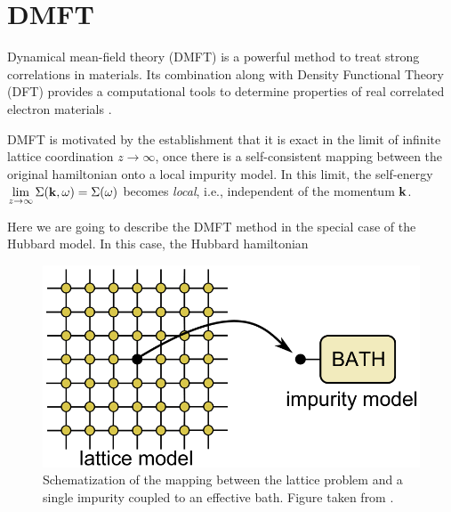 \documentclass[12pt]{report}
\begin{document}
\section{DMFT} \label{sec:dmft}

Dynamical mean-field theory (DMFT) is a powerful method to treat strong correlations in materials. Its combination along with Density Functional Theory (DFT) provides a computational tools to determine properties of real correlated electron materials \cite{hauleweb, haule_real_materials}.

\n

DMFT is motivated by the establishment that it is exact \cite{thesis_dmft_graz} in the limit of infinite lattice coordination $z \to \infty$, once there is a self-consistent mapping between the original hamiltonian onto a local impurity model. In this limit, the self-energy $\displaystyle{\lim_{z \to \infty}\Sigma(\vb{k},\omega) = \Sigma(\omega)}$ becomes \textit{local}, i.e., independent of the momentum $\vb{k}$.

Here we are going to describe the DMFT method in the special case of the Hubbard model. In this case, the Hubbard hamiltonian

\begin{figure}[H]
\centering
\includegraphics[width=0.6\linewidth]{fig/dmft-mapping}
\caption{Schematization of the mapping between the lattice problem and a single impurity coupled to an effective bath. Figure taken from \cite{thesis_dmft_graz}.}
\label{fig:dmft-mapping}
\end{figure}
\end{document}
